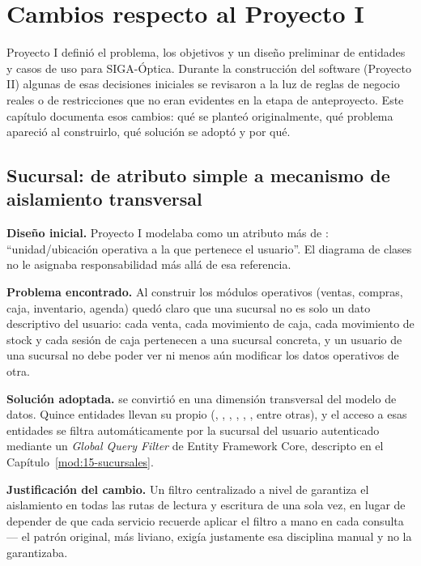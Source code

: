\chapter{Cambios respecto al Proyecto I}
\label{sec:cambios-proyecto1}

Proyecto I definió el problema, los objetivos y un diseño preliminar de entidades y casos de uso para SIGA-Óptica. Durante la construcción del software (Proyecto II) algunas de esas decisiones iniciales se revisaron a la luz de reglas de negocio reales o de restricciones que no eran evidentes en la etapa de anteproyecto. Este capítulo documenta esos cambios: qué se planteó originalmente, qué problema apareció al construirlo, qué solución se adoptó y por qué.

\section{Sucursal: de atributo simple a mecanismo de aislamiento transversal}
\label{sec:cambios-sucursal}

\textbf{Diseño inicial.} Proyecto I modelaba  como un atributo más de : ``unidad/ubicación operativa a la que pertenece el usuario''. El diagrama de clases no le asignaba responsabilidad más allá de esa referencia.

\textbf{Problema encontrado.} Al construir los módulos operativos (ventas, compras, caja, inventario, agenda) quedó claro que una sucursal no es solo un dato descriptivo del usuario: cada venta, cada movimiento de caja, cada movimiento de stock y cada sesión de caja pertenecen a una sucursal concreta, y un usuario de una sucursal no debe poder ver ni menos aún modificar los datos operativos de otra.

\textbf{Solución adoptada.}  se convirtió en una dimensión transversal del modelo de datos. Quince entidades llevan su propio  (, , , , , , entre otras), y el acceso a esas entidades se filtra automáticamente por la sucursal del usuario autenticado mediante un \emph{Global Query Filter} de Entity Framework Core, descripto en el Capítulo~\ref{mod:15-sucursales}.

\textbf{Justificación del cambio.} Un filtro centralizado a nivel de  garantiza el aislamiento en todas las rutas de lectura y escritura de una sola vez, en lugar de depender de que cada servicio recuerde aplicar el filtro a mano en cada consulta --- el patrón original, más liviano, exigía justamente esa disciplina manual y no la garantizaba.

